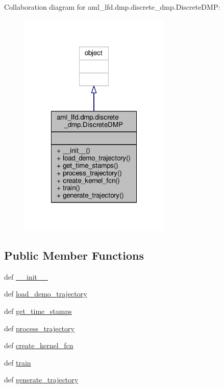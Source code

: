 Collaboration diagram for aml\-\_\-lfd.\-dmp.\-discrete\-\_\-dmp.\-Discrete\-D\-M\-P\-:
\nopagebreak
\begin{figure}[H]
\begin{center}
\leavevmode
\includegraphics[width=204pt]{classaml__lfd_1_1dmp_1_1discrete__dmp_1_1_discrete_d_m_p__coll__graph}
\end{center}
\end{figure}
\subsection*{Public Member Functions}
\begin{DoxyCompactItemize}
\item 
def \hyperlink{classaml__lfd_1_1dmp_1_1discrete__dmp_1_1_discrete_d_m_p_a0afae018e62e15edb234540305900106}{\-\_\-\-\_\-init\-\_\-\-\_\-}
\item 
def \hyperlink{classaml__lfd_1_1dmp_1_1discrete__dmp_1_1_discrete_d_m_p_a1e4c3e90a2e09b9d0632f0609d0e046d}{load\-\_\-demo\-\_\-trajectory}
\item 
def \hyperlink{classaml__lfd_1_1dmp_1_1discrete__dmp_1_1_discrete_d_m_p_a742b9e083ff20498f00dac0a3a823031}{get\-\_\-time\-\_\-stamps}
\item 
def \hyperlink{classaml__lfd_1_1dmp_1_1discrete__dmp_1_1_discrete_d_m_p_a1b999ffff82a65a6ed652d95a642772d}{process\-\_\-trajectory}
\item 
def \hyperlink{classaml__lfd_1_1dmp_1_1discrete__dmp_1_1_discrete_d_m_p_a35fc0754f0382c6850197f9d6aaa8201}{create\-\_\-kernel\-\_\-fcn}
\item 
def \hyperlink{classaml__lfd_1_1dmp_1_1discrete__dmp_1_1_discrete_d_m_p_af7cfa075be80acd8250fdcbfa4a7f05a}{train}
\item 
def \hyperlink{classaml__lfd_1_1dmp_1_1discrete__dmp_1_1_discrete_d_m_p_a240f470f6d319d32b429c5b8e494004e}{generate\-\_\-trajectory}
\end{DoxyCompactItemize}


